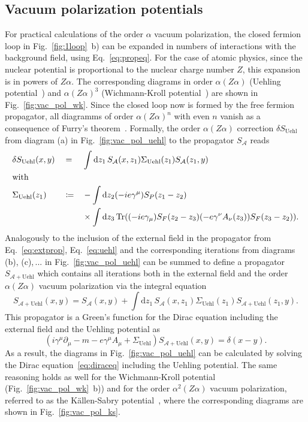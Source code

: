 \subsection{Vacuum polarization potentials}
For practical calculations of the order $\alpha$ vacuum polarization, the closed fermion loop in Fig.~\ref{fig:1loop}~b) can be expanded in numbers of interactions with the background field, using Eq.~\ref{eq:propeq}. For the case of atomic physics, since the nuclear potential is proportional to the nuclear charge number $Z$, this expansion is in powers of $Z\alpha$. The corresponding diagrams in order $\alpha(Z\alpha)$ (Uehling potential~\cite{uehling1935}) and $\alpha(Z\alpha)^3$ (Wichmann-Kroll potential~\cite{wichmann1956}) are shown in Fig.~\ref{fig:vac_pol_wk}. Since the closed loop now is formed by the free fermion propagator, all diagramms of order $\alpha(Z\alpha)^n$ with even $n$ vanish as a consequence of Furry's theorem~\mbox{\cite[Section~10.1.]{peskin1995}}. Formally, the order $\alpha (Z\alpha)$ correction $\delta S_{\text{Uehl}}$ from diagram (a) in Fig.~\ref{fig:vac_pol_uehl} to the propagator $S_{\mathcal{A}}$ reads
\begin{alignat}{3}
\label{eq:uehl}
&\delta S_{\text{Uehl}}(x,y) &&=&& \int \mathrm{d}z_1\,S_{\mathcal{A}}(x,z_1)\Sigma_{\text{Uehl}}(z_1)S_{\mathcal{A}}(z_1,y)\\
&\text{with}\notag\\
&\Sigma_{\text{Uehl}}(z_1) &&\coloneqq&& -\int\mathrm{d}z_2(-ie\gamma^\mu)S_P(z_1-z_2)\notag\\
&&&&&\times\int\mathrm{d}z_3\,\mathrm{Tr}((-ie\gamma_\mu)S_F(z_2-z_3)(-e\gamma^\nu A_\nu (z_3))S_F(z_3-z_2)).\notag
\end{alignat}
Analogously to the inclusion of the external field in the propagator from Eq.~\eqref{eq:extprop}, Eq.~\eqref{eq:uehl} and the corresponding iterations from diagrams (b), (c),$\,$... in Fig.~\ref{fig:vac_pol_uehl} can be summed to define a propagator $S_{\mathcal{A}+\text{Uehl}}$ which contains all iterations both in the external field and the order $\alpha (Z\alpha)$ vacuum polarization via the integral equation
\begin{equation}
S_{\mathcal{A}+\text{Uehl}}(x,y) = S_{\mathcal{A}}(x,y) +  \int \mathrm{d}z_1\,S_{\mathcal{A}}(x,z_1)\Sigma_{\text{Uehl}}(z_1)S_{\mathcal{A}+\text{Uehl}}(z_1,y).
\label{eq:uehlsum}
\end{equation}
This propagator is a Green's function for the Dirac equation including the external field and the Uehling potential as
\begin{equation}
\left(i\gamma^\mu \partial_\mu -m - e \gamma^\mu A_\mu + \Sigma_{\text{Uehl}}\right)S_{\mathcal{A}+\text{Uehl}}(x,y)=\delta(x-y).
\label{eq:uehlprop}
\end{equation}
As a result, the diagrams in Fig.~\ref{fig:vac_pol_uehl} can be calculated by solving the Dirac equation~\eqref{eq:diraceq} including the Uehling potential. The same reasoning holds as well for the Wichmann-Kroll potential (Fig.~\ref{fig:vac_pol_wk}~b)) and for the order $\alpha^2(Z\alpha)$ vacuum polarization, referred to as the Källen-Sabry potential~\cite{kallen1955}, where the corresponding diagrams are shown in Fig.~\ref{fig:vac_pol_ks}. 


